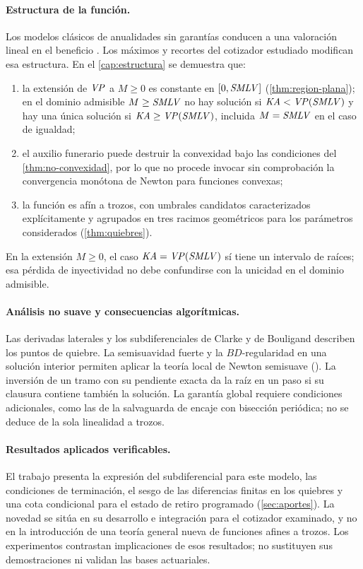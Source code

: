 \paragraph{Estructura de la función.}
Los modelos clásicos de anualidades sin garantías conducen a una valoración
lineal en el beneficio \citep{bowers1997,dickson2020,promislow2015}. Los máximos
y recortes del cotizador estudiado modifican esa estructura. En el
\cref{cap:estructura} se demuestra que:
\begin{enumerate}[label=(\roman*),leftmargin=*,nosep]
  \item la extensión de $\mathit{VP}$ a $M\ge0$ es constante en $[0,\mathit{SMLV}]$
        (\cref{thm:region-plana}); en el dominio admisible $M\ge\mathit{SMLV}$ no hay
        solución si $\mathit{KA}<\mathit{VP}(\mathit{SMLV})$ y hay una única solución si
        $\mathit{KA}\ge\mathit{VP}(\mathit{SMLV})$, incluida $M=\mathit{SMLV}$ en el caso de igualdad;
  \item el auxilio funerario puede destruir la convexidad bajo las condiciones
        del \cref{thm:no-convexidad}, por lo que no procede invocar sin
        comprobación la convergencia monótona de Newton para funciones convexas;
  \item la función es afín a trozos, con umbrales candidatos caracterizados
        explícitamente y agrupados en tres racimos geométricos para los
        parámetros considerados (\cref{thm:quiebres}).
\end{enumerate}
En la extensión $M\ge0$, el caso $\mathit{KA}=\mathit{VP}(\mathit{SMLV})$ sí tiene un intervalo de
raíces; esa pérdida de inyectividad no debe confundirse con la unicidad en el
dominio admisible.

\paragraph{Análisis no suave y consecuencias algorítmicas.}
Las derivadas laterales y los subdiferenciales de Clarke y de Bouligand
\citep{clarke1983,qi1993} describen los puntos de quiebre. La semisuavidad fuerte
y la $BD$\nobreakdash-regularidad en una solución interior permiten aplicar la
teoría local de Newton semisuave \citep{qi1993,facchinei2003}
(). La inversión de un tramo con
su pendiente exacta da la raíz en un paso si su clausura contiene también la
solución. La garantía global requiere condiciones adicionales, como las de la
salvaguarda de encaje con bisección periódica; no se deduce de la sola linealidad
a trozos.

\paragraph{Resultados aplicados verificables.}
El trabajo presenta la expresión del subdiferencial para este modelo, las
condiciones de terminación, el sesgo de las diferencias finitas en los quiebres y
una cota condicional para el estado de retiro programado
(\cref{sec:aportes}). La novedad se sitúa en su desarrollo e integración para el
cotizador examinado, y no en la introducción de una teoría general nueva de
funciones afines a trozos. Los experimentos contrastan implicaciones de esos
resultados; no sustituyen sus demostraciones ni validan las bases actuariales.

